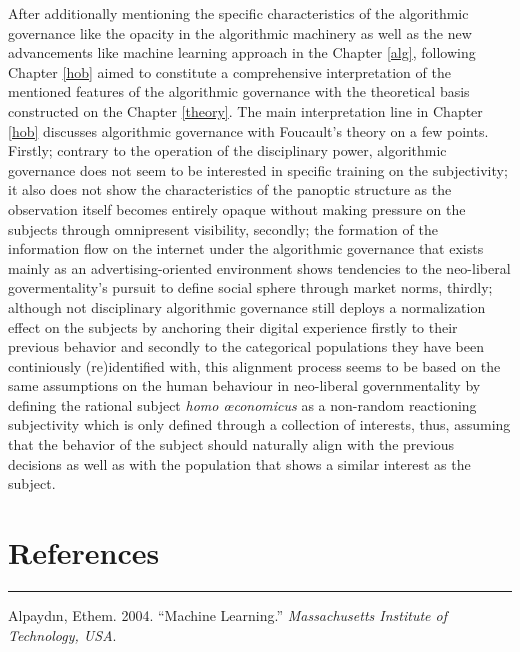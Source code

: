 \documentclass[12pt,twoside]{report}
\begin{document}
After additionally mentioning the specific characteristics of the algorithmic governance like the opacity in the algorithmic machinery as well as the new advancements like machine learning approach in the Chapter \ref{alg}, following Chapter \ref{hob} aimed to constitute a comprehensive interpretation of the mentioned features of the algorithmic governance with the theoretical basis constructed on the Chapter \ref{theory}. The main interpretation line in Chapter \ref{hob} discusses algorithmic governance with Foucault's theory on a few points. Firstly; contrary to the operation of the disciplinary power, algorithmic governance does not seem to be interested in specific training on the subjectivity; it also does not show the characteristics of the panoptic structure as the observation itself becomes entirely opaque without making pressure on the subjects through omnipresent visibility, secondly; the formation of the information flow on the internet under the algorithmic governance that exists mainly as an advertising-oriented environment shows tendencies to the neo-liberal govermentality's pursuit to define social sphere through market norms, thirdly; although not disciplinary algorithmic governance still deploys a normalization effect on the subjects by anchoring their digital experience firstly to their previous behavior and secondly to the categorical populations they have been continiously (re)identified with, this alignment process seems to be based on the same assumptions on the human behaviour in neo-liberal governmentality by defining the rational subject \emph{homo œconomicus} as a non-random reactioning subjectivity which is only defined through a collection of interests, thus, assuming that the behavior of the subject should naturally align with the previous decisions as well as with the population that shows a similar interest as the subject.

\hypertarget{references}{%
\chapter*{References}\label{references}}

\begin{center}\rule{0.5\linewidth}{\linethickness}\end{center}

\hypertarget{refs}{}
\leavevmode\hypertarget{ref-Alpaydin2004}{}%
Alpaydın, Ethem. 2004. ``Machine Learning.'' \emph{Massachusetts Institute of Technology, USA}.
\end{document}
